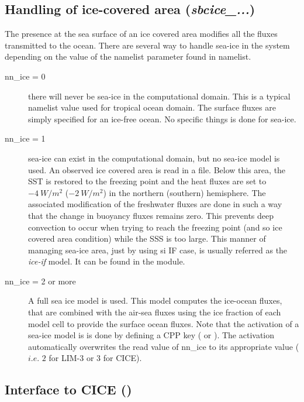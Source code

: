 \documentclass[../tex_main/NEMO_manual]{subfiles}
\begin{document}
\subsection{Handling of ice-covered area  (\textit{sbcice\_...})}
\label{subsec:SBC_ice-cover}

The presence at the sea surface of an ice covered area modifies all the fluxes 
transmitted to the ocean. There are several way to handle sea-ice in the system 
depending on the value of the  namelist parameter found in  namelist.  
\begin{description}
\item[nn{\_}ice = 0]  there will never be sea-ice in the computational domain. 
This is a typical namelist value used for tropical ocean domain. The surface fluxes 
are simply specified for an ice-free ocean. No specific things is done for sea-ice.
\item[nn{\_}ice = 1]  sea-ice can exist in the computational domain, but no sea-ice model 
is used. An observed ice covered area is read in a file. Below this area, the SST is 
restored to the freezing point and the heat fluxes are set to $-4~W/m^2$ ($-2~W/m^2$) 
in the northern (southern) hemisphere. The associated modification of the freshwater 
fluxes are done in such a way that the change in buoyancy fluxes remains zero. 
This prevents deep convection to occur when trying to reach the freezing point 
(and so ice covered area condition) while the SSS is too large. This manner of 
managing sea-ice area, just by using si IF case, is usually referred as the \textit{ice-if} 
model. It can be found in the  module.
\item[nn{\_}ice = 2 or more]  A full sea ice model is used. This model computes the 
ice-ocean fluxes, that are combined with the air-sea fluxes using the ice fraction of 
each model cell to provide the surface ocean fluxes. Note that the activation of a 
sea-ice model is is done by defining a CPP key ( or ). 
The activation automatically overwrites the read value of nn{\_}ice to its appropriate 
value ($i.e.$ $2$ for LIM-3 or $3$ for CICE).
\end{description}


\subsection{Interface to CICE (\protect{})}
\label{subsec:SBC_cice}
\end{document}
